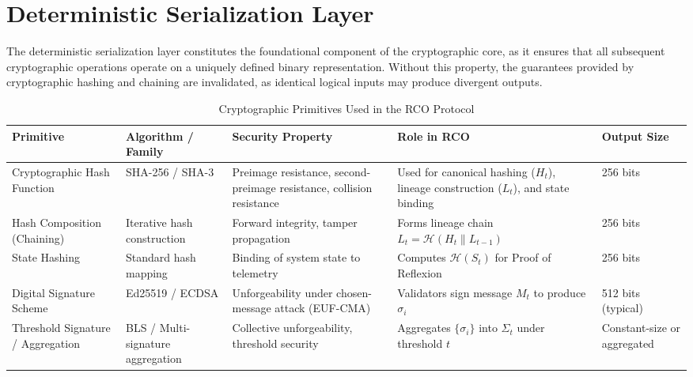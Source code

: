 \section{Deterministic Serialization Layer}

The deterministic serialization layer constitutes the foundational component of the cryptographic core, as it ensures that all subsequent cryptographic operations operate on a uniquely defined binary representation. Without this property, the guarantees provided by cryptographic hashing and chaining are invalidated, as identical logical inputs may produce divergent outputs.

\begin{table}[htbp]
\footnotesize
\centering
\caption{Cryptographic Primitives Used in the RCO Protocol}
\label{tab:crypto-primitives}

\renewcommand{\arraystretch}{1.25}

\begin{tabularx}{\textwidth}{|p{2.8cm}|p{3cm}|X|X|p{2.5cm}|}
\hline
\textbf{Primitive} & \textbf{Algorithm / Family} & \textbf{Security Property} & \textbf{Role in RCO} & \textbf{Output Size} \\
\hline

Cryptographic Hash Function & SHA-256 / SHA-3 & Preimage resistance, second-preimage resistance, collision resistance & Used for canonical hashing ($H_t$), lineage construction ($L_t$), and state binding & 256 bits \\

\hline

Hash Composition (Chaining) & Iterative hash construction & Forward integrity, tamper propagation & Forms lineage chain $L_t = \mathcal{H}(H_t \parallel L_{t-1})$ & 256 bits \\

\hline

State Hashing & Standard hash mapping & Binding of system state to telemetry & Computes $\mathcal{H}(S_t)$ for Proof of Reflexion & 256 bits \\

\hline

Digital Signature Scheme & Ed25519 / ECDSA & Unforgeability under chosen-message attack (EUF-CMA) & Validators sign message $M_t$ to produce $\sigma_i$ & 512 bits (typical) \\

\hline

Threshold Signature / Aggregation & BLS / Multi-signature aggregation & Collective unforgeability, threshold security & Aggregates $\{\sigma_i\}$ into $\Sigma_t$ under threshold $t$ & Constant-size or aggregated \\


\end{tabularx}
\end{table}
